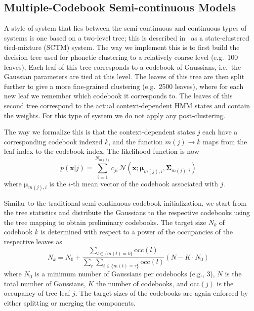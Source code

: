 \documentclass{article}
\def \x{{\mathbf x}}
\def \m{{\bm \mu}}
\def \k{{\mathbf \Sigma}}
\def \nv{{\mathcal N}}
\begin{document}
\subsection{Multiple-Codebook Semi-continuous Models}
A style of system that lies between the semi-continuous and continuous types of
systems is one based on a two-level tree; this is described in~\cite{prasad2004t2b}
as a state-clustered tied-mixture (SCTM) system. The way we implement this is
to first build the decision tree used for phonetic clustering to a relatively
coarse level (e.g.~100 leaves). Each leaf of this tree corresponds to a codebook of Gaussians, i.e.~the Gaussian parameters are tied at this level. The leaves 
of this tree are then split further to give a more fine-grained clustering (e.g.~2500 leaves), where for each new leaf we remember which codebook it corresponds to. The leaves of this second tree correspond to the actual context-dependent HMM states and contain the weights.
For this type of system we do not apply any post-clustering.

The way we formalize this is that the context-dependent states $j$ each have 
a corresponding codebook indexed $k$, and the function $m(j) \rightarrow k$ 
maps from the leaf index to the codebook index. The likelihood function is now
%
\begin{equation}
p(\x | j) = \sum_{i=1}^{N_{m(j)}} c_{ji} \, \nv\left(\x; \m_{m(j), i}, \k_{m(j), i}\right)
\end{equation}
%
where $\m_{m(j), i}$ is the $i$-th mean vector of the codebook
associated with $j$.

Similar to the traditional semi-continuous codebook initialization, we start
from the tree statistics and distribute the Gaussians to the respective codebooks
using the tree mapping to obtain preliminary codebooks.
The target size $N_k$ of codebook $k$ is determined with respect to a power
of the occupancies of the respective leaves as
\begin{equation}
N_k = N_0 + \frac
  { \sum_{l \in \{m(l) = k\}} \text{occ}(l) }
  { \sum_r \sum_{t \in \{m(t) = r\}} \text{occ}(l) } 
  \left( N - K \cdot N_0 \right)
\end{equation}
where $N_0$ is a minimum number of Gaussians per codebooks (e.g., 3), $N$ is
the total number of Gaussians, $K$ the number of codebooks, and $\text{occ}(j)$ 
is the occupancy of tree leaf $j$. 
%
%
The target sizes of the codebooks are again enforced by either splitting or
merging the components.
\end{document}
